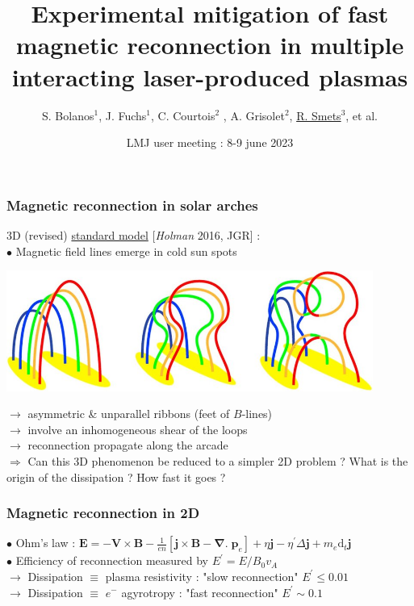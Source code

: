 \documentclass{beamer}
\title{Experimental mitigation of fast magnetic reconnection in multiple interacting laser-produced plasmas}
\author{S. Bolanos$^1$, J. Fuchs$^1$, C. Courtois$^2$ , A. Grisolet$^2$, \underline{R. Smets}$^3$, et al.}
\institute{$^1$LULI, $^2$CEA, $^3$LPP...}
\date{LMJ user meeting : 8-9 june 2023}
\newcommand{\D}{{\mathrm d}}
\begin{document}
\frame{\titlepage}



\begin{frame}
\frametitle{Magnetic reconnection in solar arches}

3D (revised) \underline{standard model} [\textit{Holman} 2016, JGR] : \\[0.4cm]
$\bullet$ Magnetic field lines emerge in cold sun spots

\begin{center}
\includegraphics[width=0.9\textwidth]{standard_model.jpg}
\end{center}

$\to$ asymmetric \& unparallel ribbons (feet of $B$-lines) \\
$\to$ involve an inhomogeneous shear of the loops \\
$\to$ reconnection propagate along the arcade \\

$\Rightarrow$ Can this 3D phenomenon be reduced to a simpler 2D problem ?
What is the origin of the dissipation ?
How fast it goes ?

\end{frame}



\begin{frame}
\frametitle{Magnetic reconnection in 2D}

\begin{center}

\end{center}

$\bullet$ Ohm's law : $\mathbf E = - \mathbf V \times \mathbf B - \frac{1}{en} [\mathbf j \times \mathbf B - \boldsymbol{\nabla} . \; \mathbf p_e] + \eta \mathbf j - \eta^{\prime} \Delta \mathbf j + m_e \D _t \mathbf j$ \\[0.4cm]
$\bullet$ Efficiency  of reconnection measured by $E^{\prime} = E/B_0 v_A$ \\[0.4cm]
$\to$ Dissipation $\equiv$ plasma resistivity : "slow reconnection" $E^{\prime} \le 0.01$\\
$\to$ Dissipation $\equiv$ $e^-$ agyrotropy : "fast reconnection" $E^{\prime} \sim 0.1$ \\

\end{frame}
\end{document}
